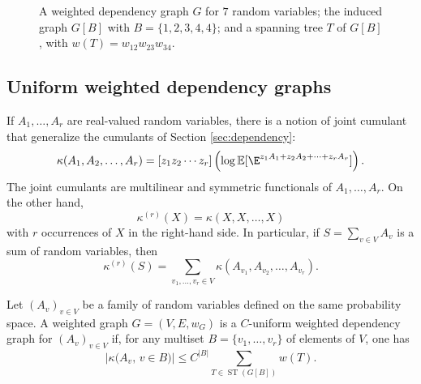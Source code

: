 \documentclass[envcountsame]{svmult}
\def\WDep{G}
\def\ka{\kappa}
\newcommand{\esper}{\mathbb{E}}
\DeclareMathOperator{\ST}{ST}
\begin{document}
\begin{figure}[ht]
\caption{A weighted dependency graph $\WDep$ for $7$ random variables; the induced graph $\WDep[B]$ with $B=\{1,2,3,4,4\}$; and a spanning tree $T$ of $\WDep[B]$, with $w(T)=w_{12}w_{23}w_{34}$.\label{fig:weighteddependency}}
\end{figure}



\subsection{Uniform weighted dependency graphs}
If $A_1,\ldots,A_r$ are real-valued random variables, there is a notion of joint cumulant that generalize the cumulants of Section \ref{sec:dependency}:
$$\kappa(A_1,A_2,\ldots,A_r) = [z_1z_2\cdots z_r]\left(\log \esper[\E^{z_1A_1+z_2A_2+\cdots+z_rA_r}]\right).$$
The joint cumulants are multilinear and symmetric functionals of $A_1,\ldots,A_r$. On the other hand, 
$$\kappa^{(r)}(X) = \kappa(X,X,\ldots,X)$$
with $r$ occurrences of $X$ in the right-hand side. In particular, if $S=\sum_{v \in V}A_v$ is a sum of random variables, then
$$\kappa^{(r)}(S) = \sum_{v_1,\ldots,v_r \in V} \kappa(A_{v_1},A_{v_2},\ldots,A_{v_r}).$$


\begin{definition}\label{def:UWDG}
Let $(A_v)_{v \in V}$ be a family of random variables defined on the same probability space. A weighted graph $\WDep=(V,E,w_G)$ is a $C$-uniform weighted dependency graph for $(A_v)_{v \in V}$ if, 
for any multiset \hbox{$B=\{v_1,\ldots,v_r\}$} of elements of $V$,
one has
$$
    \left| \ka\big( A_v,\, v \in B \big) \right| \leq
    C^{|B|} \sum_{T \in \ST(\WDep[B])} w(T).
$$
\end{definition}
\end{document}
